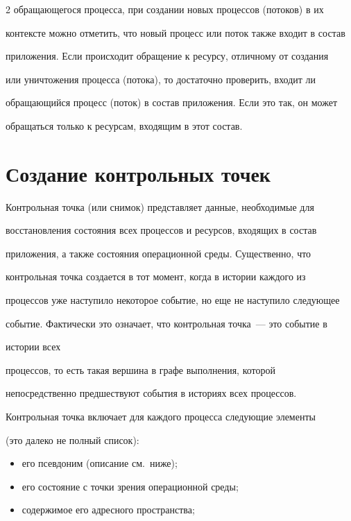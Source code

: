 \begin{multicols}{2}
обращающегося процесса, при создании новых процессов (потоков) в их

контексте можно отметить, что новый процесс или поток также входит в состав

приложения. Если происходит обращение к ресурсу, отличному от создания

или уничтожения процесса (потока), то достаточно проверить, входит ли

обращающийся процесс (поток) в состав приложения. Если это так, он  может

обращаться только к ресурсам, входящим в этот состав.



\section{Создание контрольных точек}



Контрольная точка (или снимок) пред\-став\-ля\-ет данные, необходимые для

восстановления со\-сто\-яния всех процессов и ресурсов, входящих в состав

приложения, а также состояния операционной среды. Существенно, что

контрольная точка создается в тот момент, когда в истории каждого из

процессов уже наступило некоторое событие, но еще не наступило следующее

событие. Фактически это означает, что контрольная точка~--- это событие в

истории всех

 процессов, то есть такая вершина в графе выполнения, которой

непосредственно предшествуют события в историях всех процессов.



Контрольная точка включает для каждого процесса следующие элементы

(это далеко не полный список):

\begin{itemize}

\item его псевдоним (описание см.\ ниже);

\item его состояние с точки зрения операционной среды;

\item содержимое его адресного пространства;


\end{itemize}
\end{multicols}
